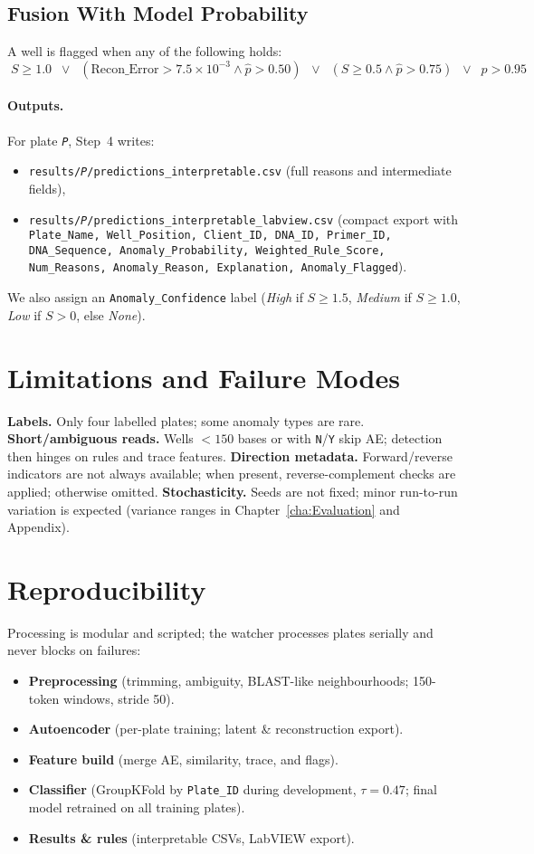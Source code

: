 \subsection{Fusion With Model Probability}
A well is flagged when any of the following holds:
\[
\boxed{\;
S \ge 1.0
\;\;\lor\;\;
(\text{Recon\_Error} > 7.5\times 10^{-3} \land \hat p > 0.50)
\;\;\lor\;\;
(S \ge 0.5 \land \hat p > 0.75)
\;\;\lor\;\;
\hat p > 0.95 \;
}
\]

\paragraph{Outputs.} For plate \texttt{\textit{P}}, Step~4 writes:
\begin{itemize}
  \item \texttt{results/\textit{P}/predictions\_interpretable.csv} (full reasons and intermediate fields),
  \item \texttt{results/\textit{P}/predictions\_interpretable\_labview.csv} (compact export with \texttt{Plate\_Name, Well\_Position, Client\_ID, DNA\_ID, Primer\_ID, DNA\_Sequence, Anomaly\_Probability, Weighted\_Rule\_Score, Num\_Reasons, Anomaly\_Reason, Explanation, Anomaly\_Flagged}).
\end{itemize}
We also assign an \texttt{Anomaly\_Confidence} label (\emph{High} if $S\ge 1.5$, \emph{Medium} if $S\ge 1.0$, \emph{Low} if $S>0$, else \emph{None}).

\section{Limitations and Failure Modes}
\label{sec:limits}
\textbf{Labels.} Only four labelled plates; some anomaly types are rare.  
\textbf{Short/ambiguous reads.} Wells $<150$ bases or with \texttt{N}/\texttt{Y} skip AE; detection then hinges on rules and trace features.  
\textbf{Direction metadata.} Forward/reverse indicators are not always available; when present, reverse-complement checks are applied; otherwise omitted.  
\textbf{Stochasticity.} Seeds are not fixed; minor run-to-run variation is expected (variance ranges in Chapter~\ref{cha:Evaluation} and Appendix).

\section{Reproducibility}
\label{sec:repro}
Processing is modular and scripted; the watcher processes plates serially and never blocks on failures:
\begin{itemize}
  \item \textbf{Preprocessing} (trimming, ambiguity, BLAST-like neighbourhoods; 150-token windows, stride 50).
  \item \textbf{Autoencoder} (per-plate training; latent \& reconstruction export).
  \item \textbf{Feature build} (merge AE, similarity, trace, and flags).
  \item \textbf{Classifier} (GroupKFold by \texttt{Plate\_ID} during development, $\tau=0.47$; final model retrained on all training plates).
  \item \textbf{Results \& rules} (interpretable CSVs, LabVIEW export).
\end{itemize}
